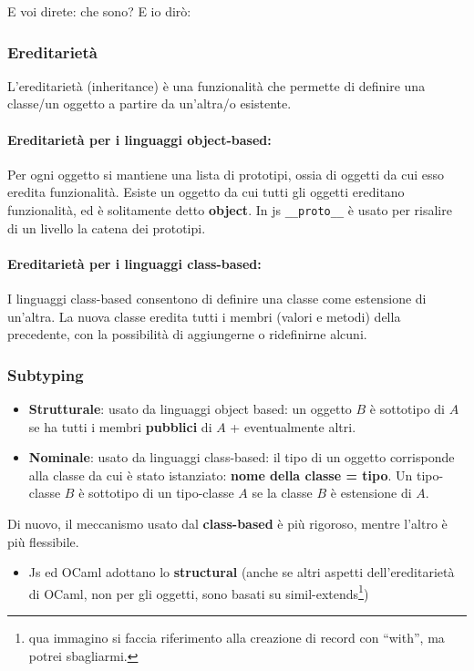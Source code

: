 \documentclass[a4paper,10pt]{article}
\begin{document}
E voi direte: che sono? E io dirò:

\subsubsection{Ereditarietà}
L'ereditarietà (inheritance) è una funzionalità che permette di definire una classe/un oggetto a partire da un'altra/o esistente.

\paragraph{Ereditarietà per i linguaggi object-based:} Per ogni oggetto si mantiene una lista di prototipi, ossia di oggetti da cui esso eredita funzionalità. Esiste un oggetto da cui tutti gli oggetti ereditano funzionalità, ed è solitamente detto \textbf{object}. In js \texttt{\_\_proto\_\_} è usato per risalire di un livello la catena dei prototipi.

\paragraph{Ereditarietà per i linguaggi class-based:} I linguaggi class-based consentono di definire una classe come estensione di un'altra. La nuova classe eredita tutti i membri (valori e metodi) della precedente, con la possibilità di aggiungerne o ridefinirne alcuni. 

\subsubsection{Subtyping}
\begin{itemize}
 \item \textbf{Strutturale}: usato da linguaggi object based: un oggetto $B$ è sottotipo di $A$ se ha tutti i membri \textbf{pubblici} di $A$ + eventualmente altri.
 \item \label{nominal}\textbf{Nominale}: usato da linguaggi class-based: il tipo di un oggetto corrisponde alla classe da cui è stato istanziato: \textbf{nome della classe = tipo}. Un tipo-classe $B$ è sottotipo di un tipo-classe $A$ se la classe $B$ è estensione di $A$.
\end{itemize}


Di nuovo, il meccanismo usato dal \textbf{class-based} è più rigoroso, mentre l'altro è più flessibile.

\begin{itemize}
 \item Js ed OCaml adottano lo \textbf{structural} (anche se altri aspetti dell'ereditarietà di OCaml, non per gli oggetti, sono basati su simil-extends\footnote{qua immagino si faccia riferimento alla creazione di record con ``with'', ma potrei sbagliarmi.})
\end{itemize}
\end{document}
